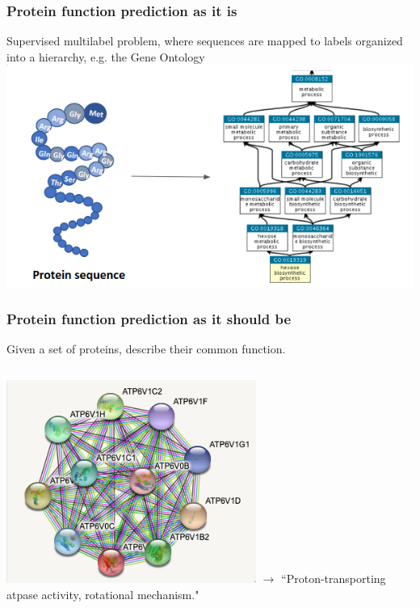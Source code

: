 \documentclass{beamer}
\begin{document}


\begin{frame}
    \frametitle{Protein function prediction as it is}
    Supervised multilabel problem, where sequences are mapped to labels organized into a hierarchy, e.g. the Gene Ontology
    \center\includegraphics[height=0.4\textheight]{sequence_to_go_tree.png}
\end{frame}

\begin{frame}
    \frametitle{Protein function prediction as it \textbf{should be}}
    Given a set of proteins, describe their common function.
    \bigskip
    \begin{columns}
     \includegraphics[height=0.4\textheight]{atpase_activity.png}
     \center $\rightarrow$
     ``Proton-transporting atpase activity, rotational mechanism."
    \end{columns}
\end{frame}
\end{document}
